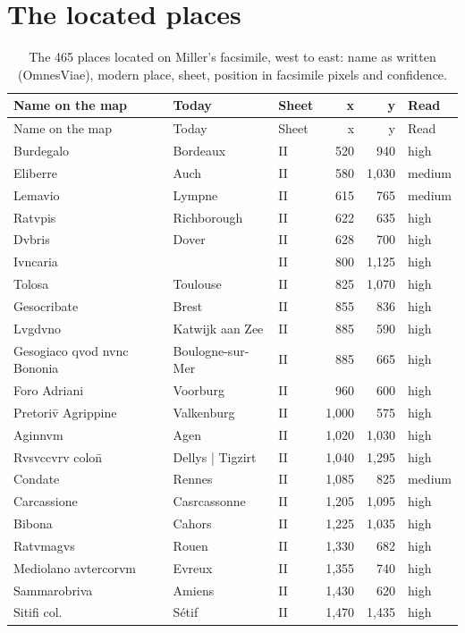 \documentclass[11pt,a4paper]{article}
\begin{document}
\section{The located places}
{\footnotesize\setlength{\tabcolsep}{4pt}\begin{longtable}{p{4.6cm}p{5.2cm}lrrl}\caption{The 465 places located on Miller's facsimile, west to east: name as written (OmnesViae), modern place, sheet, position in facsimile pixels and confidence.}\label{tab:located}\\\toprule Name on the map & Today & Sheet & x & y & Read\\\midrule\endfirsthead\toprule Name on the map & Today & Sheet & x & y & Read\\\midrule\endhead
Burdegalo & Bordeaux & II & 520 & 940 & high\\
Eliberre & Auch & II & 580 & 1,030 & medium\\
Lemavio & Lympne & II & 615 & 765 & medium\\
Ratvpis & Richborough & II & 622 & 635 & high\\
Dvbris & Dover & II & 628 & 700 & high\\
Ivncaria &  & II & 800 & 1,125 & high\\
Tolosa & Toulouse & II & 825 & 1,070 & high\\
Gesocribate & Brest & II & 855 & 836 & high\\
Lvgdvno & Katwijk aan Zee & II & 885 & 590 & high\\
Gesogiaco qvod nvnc Bononia & Boulogne-sur-Mer & II & 885 & 665 & high\\
Foro Adriani & Voorburg & II & 960 & 600 & high\\
Pretoriv̄ Agrippine & Valkenburg & II & 1,000 & 575 & high\\
Aginnvm & Agen & II & 1,020 & 1,030 & high\\
Rvsvccvrv colon̄ & Dellys | Tigzirt & II & 1,040 & 1,295 & high\\
Condate & Rennes & II & 1,085 & 825 & medium\\
Carcassione & Casrcassonne & II & 1,205 & 1,095 & high\\
Bibona & Cahors & II & 1,225 & 1,035 & high\\
Ratvmagvs & Rouen & II & 1,330 & 682 & high\\
Mediolano avtercorvm & Evreux & II & 1,355 & 740 & high\\
Sammarobriva & Amiens & II & 1,430 & 620 & high\\
Sitifi col. & Sétif & II & 1,470 & 1,435 & high\\

\end{longtable}}
\end{document}
